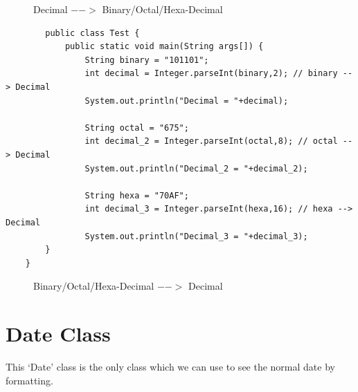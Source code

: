 \documentclass[openany]{book}  %
\begin{document}
% 
\begin{figure}[htbp]
    \begin{center}
        \caption{Decimal $-->$ Binary/Octal/Hexa-Decimal}
    \end{center}
\end{figure}
\begin{center}
    \begin{verbatim}
        public class Test {
            public static void main(String args[]) {
                String binary = "101101";
                int decimal = Integer.parseInt(binary,2); // binary --> Decimal
                System.out.println("Decimal = "+decimal);
        
                String octal = "675";
                int decimal_2 = Integer.parseInt(octal,8); // octal --> Decimal
                System.out.println("Decimal_2 = "+decimal_2);
        
                String hexa = "70AF";
                int decimal_3 = Integer.parseInt(hexa,16); // hexa --> Decimal
                System.out.println("Decimal_3 = "+decimal_3);
        }
    }
    \end{verbatim}
\end{center}
% 
% 
\begin{figure}[htbp]
    \begin{center}
        \caption{Binary/Octal/Hexa-Decimal $-->$ Decimal}
    \end{center}
\end{figure}
% 
% 
\section{Date Class}
This `Date' class is the only class which we can use to see the normal date by \\
formatting.
% 
% 
\end{document}
